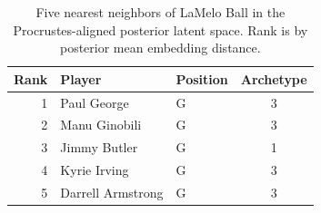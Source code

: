 \begin{table}[htbp]
  \centering\small
  \begin{tabular}{rllc}
    \toprule
    Rank & Player & Position & Archetype \\
    \midrule
    1 & Paul George & G & 3 \\
    2 & Manu Ginobili & G & 3 \\
    3 & Jimmy Butler & G & 1 \\
    4 & Kyrie Irving & G & 3 \\
    5 & Darrell Armstrong & G & 3 \\
    \bottomrule
  \end{tabular}
  \caption{Five nearest neighbors of LaMelo Ball in the Procrustes-aligned posterior latent space. Rank is by posterior mean embedding distance.}
  \label{tab:LaMelo_Ball_neighbors}
\end{table}

